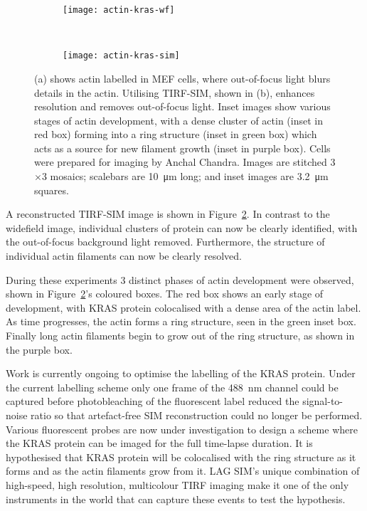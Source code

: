 \begin{figure}[tbp!]
\centering
\begin{subfigure}[b]{0.82\textwidth}
	\texttt{[image: actin-kras-wf]}
	\caption{}\label{fig:widefield-actin}
\end{subfigure}

~\newline
\begin{subfigure}[b]{0.82\textwidth}
	\texttt{[image: actin-kras-sim]}
	\caption{}\label{fig:recon-tirf-actin}
\end{subfigure}
\caption[LAG SIM: TIRF-SIM imaging of actin in MEF cells removes out-of-focus light allowing actin development to be studied]{(a) shows actin labelled in MEF cells, where out-of-focus light blurs details in the actin. Utilising TIRF-SIM, shown in (b), enhances resolution and removes out-of-focus light. Inset images show various stages of actin development, with a dense cluster of actin (inset in red box) forming into a ring structure (inset in green box) which acts as a source for new filament growth (inset in purple box). Cells were prepared for imaging by Anchal Chandra. Images are stitched 3$\times$3 mosaics; scalebars are \SI{10}{\micro\metre} long; and inset images are \SI{3.2}{\micro\metre} squares.}
\label{fig:recon-actin}
\end{figure}
\afterpage{\clearpage}

A reconstructed TIRF-SIM image is shown in Figure~\ref{fig:recon-tirf-actin}.
In contrast to the widefield image, individual clusters of protein can now be clearly identified, with the out-of-focus background light removed.
Furthermore, the structure of individual actin filaments can now be clearly resolved.

During these experiments 3 distinct phases of actin development were observed, shown in Figure~\ref{fig:recon-tirf-actin}'s coloured boxes.
The red box shows an early stage of development, with KRAS protein colocalised with a dense area of the actin label.
As time progresses, the actin forms a ring structure, seen in the green inset box.
Finally long actin filaments begin to grow out of the ring structure, as shown in the purple box.

Work is currently ongoing to optimise the labelling of the KRAS protein.
Under the current labelling scheme only one frame of the \SI{488}{\nano\metre} channel could be captured before photobleaching of the fluorescent label reduced the signal-to-noise ratio so that artefact-free SIM reconstruction could no longer be performed.
Various fluorescent probes are now under investigation to design a scheme where the KRAS protein can be imaged for the full time-lapse duration.
It is hypothesised that KRAS protein will be colocalised with the ring structure as it forms and as the actin filaments grow from it.
LAG SIM's unique combination of high-speed, high resolution, multicolour TIRF imaging make it one of the only instruments in the world that can capture these events to test the hypothesis.


